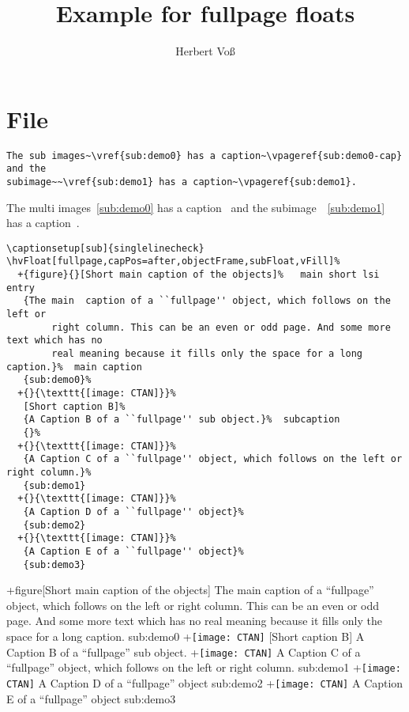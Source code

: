 \documentclass{scrartcl}
\begin{document}
\title{Example for fullpage floats}
\author{Herbert Voß}
\maketitle

\tableofcontents

\blinddocument

\section{File \texttt{\jobname}}

\begin{lstlisting}
The sub images~\vref{sub:demo0} has a caption~\vpageref{sub:demo0-cap} and the
subimage~~\vref{sub:demo1} has a caption~\vpageref{sub:demo1}.
\end{lstlisting}

The multi images~\vref{sub:demo0} has a caption~ and the
subimage~~\vref{sub:demo1} has a caption~.

\begin{lstlisting}
\captionsetup[sub]{singlelinecheck}
\hvFloat[fullpage,capPos=after,objectFrame,subFloat,vFill]%
  +{figure}{}[Short main caption of the objects]%   main short lsi entry
   {The main  caption of a ``fullpage'' object, which follows on the left or
        right column. This can be an even or odd page. And some more text which has no
        real meaning because it fills only the space for a long caption.}%  main caption
   {sub:demo0}%
  +{}{\texttt{[image: CTAN]}}%
   [Short caption B]%
   {A Caption B of a ``fullpage'' sub object.}%  subcaption
   {}%
  +{}{\texttt{[image: CTAN]}}%
   {A Caption C of a ``fullpage'' object, which follows on the left or right column.}%
   {sub:demo1}
  +{}{\texttt{[image: CTAN]}}%
   {A Caption D of a ``fullpage'' object}%
   {sub:demo2}
  +{}{\texttt{[image: CTAN]}}%
   {A Caption E of a ``fullpage'' object}%
   {sub:demo3}
\end{lstlisting}

\Float[subFloat]
\captionsetup[sub]{singlelinecheck}
\hvFloat[fullpage,capPos=after,objectFrame,subFloat,vFill]%
  +{figure}{}[Short main caption of the objects]%
   {The main  caption of a ``fullpage'' object, which follows on the left or
        right column. This can be an even or odd page. And some more text which has no
        real meaning because it fills only the space for a long caption.}%
   {sub:demo0}%
  +{}{\texttt{[image: CTAN]}}%
   [Short caption B]%
   {A Caption B of a ``fullpage'' sub object.}%
   {}%
  +{}{\texttt{[image: CTAN]}}%
   {A Caption C of a ``fullpage'' object, which follows on the left or right column.}%
   {sub:demo1}
  +{}{\texttt{[image: CTAN]}}%
   {A Caption D of a ``fullpage'' object}%
   {sub:demo2}
  +{}{\texttt{[image: CTAN]}}%
   {A Caption E of a ``fullpage'' object}%
   {sub:demo3}
\end{document}
